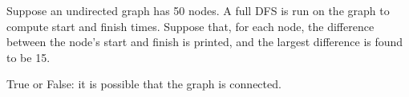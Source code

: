 \Needspace{1.5in}
\begin{prob}

    Suppose an undirected graph has 50 nodes. A full DFS is run on the graph to
    compute start and finish times. Suppose that, for each node, the difference
    between the node's start and finish is printed, and the largest difference
    is found to be 15.

    True or False: it is possible that the graph is connected.

    \tF{}

\end{prob}
